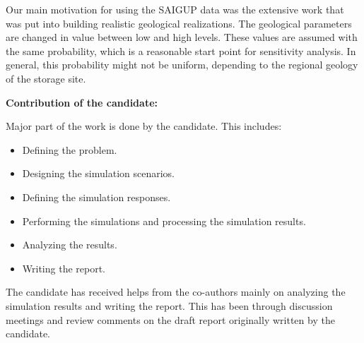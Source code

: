 {\begin{itemize}
Our main motivation for using the SAIGUP data was the extensive work that was put into building realistic geological realizations. The geological parameters are changed in value between low and high levels. These values are assumed with the same probability, which is a reasonable start point for sensitivity analysis. In general, this probability might not be uniform, depending to the regional geology of the storage site. 

\end{itemize}
\vspace{0.5cm}
\noindent\textbf{Contribution of the candidate:}

Major part of the work is done by the candidate. This includes:
\begin{itemize}
\item Defining the problem.
\item Designing the simulation scenarios.
\item Defining the simulation responses.
\item Performing the simulations  and processing the simulation results.
\item Analyzing the results.
\item Writing the report.
\end{itemize}

The candidate has received helps from the co-authors mainly on analyzing the simulation  results and writing the report. This has been through discussion meetings and review comments on the draft report originally written by the candidate. 
}%


